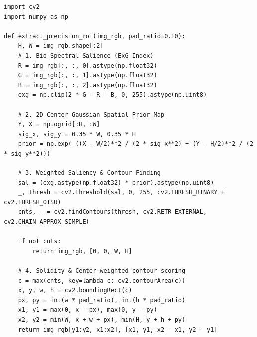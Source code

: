 \begin{tcolorbox}[title=\textbf{สคริปต์ Agri-Vision 2.0 Precision ROI Extraction}]
\fontsize{8.5}{11}\selectfont
\begin{verbatim}
import cv2
import numpy as np

def extract_precision_roi(img_rgb, pad_ratio=0.10):
    H, W = img_rgb.shape[:2]
    # 1. Bio-Spectral Salience (ExG Index)
    R = img_rgb[:, :, 0].astype(np.float32)
    G = img_rgb[:, :, 1].astype(np.float32)
    B = img_rgb[:, :, 2].astype(np.float32)
    exg = np.clip(2 * G - R - B, 0, 255).astype(np.uint8)

    # 2. 2D Center Gaussian Spatial Prior Map
    Y, X = np.ogrid[:H, :W]
    sig_x, sig_y = 0.35 * W, 0.35 * H
    prior = np.exp(-((X - W/2)**2 / (2 * sig_x**2) + (Y - H/2)**2 / (2 * sig_y**2)))
    
    # 3. Weighted Saliency & Contour Finding
    sal = (exg.astype(np.float32) * prior).astype(np.uint8)
    _, thresh = cv2.threshold(sal, 0, 255, cv2.THRESH_BINARY + cv2.THRESH_OTSU)
    cnts, _ = cv2.findContours(thresh, cv2.RETR_EXTERNAL, cv2.CHAIN_APPROX_SIMPLE)
    
    if not cnts:
        return img_rgb, [0, 0, W, H]
    
    # 4. Solidity & Center-weighted contour scoring
    c = max(cnts, key=lambda c: cv2.contourArea(c))
    x, y, w, h = cv2.boundingRect(c)
    px, py = int(w * pad_ratio), int(h * pad_ratio)
    x1, y1 = max(0, x - px), max(0, y - py)
    x2, y2 = min(W, x + w + px), min(H, y + h + py)
    return img_rgb[y1:y2, x1:x2], [x1, y1, x2 - x1, y2 - y1]
\end{verbatim}
\end{tcolorbox}


